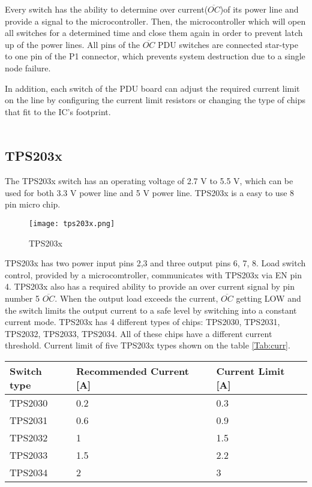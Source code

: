 Every switch has the ability to determine over current($\overline{OC}$)of its power line and provide a signal to the microcontroller. Then, the microcontroller which will open all switches for a determined time and close them again in order to prevent latch up of the power lines. All pins of the $ \overline {OC} $ PDU switches are connected star-type to one pin of the P1 connector, which prevents system destruction due to a single node failure.

In addition, each switch of the PDU board can adjust the required current limit on the line by configuring the current limit resistors or changing the type of chips that fit to the IC's footprint.    
  \\ \\
\subsection{TPS203x }
The TPS203x switch has an operating voltage of 2.7 V to 5.5 V, which can be used for both 3.3 V power line and 5 V power line. TPS203x is a easy to use 8 pin micro chip. 

\begin{figure}[h]
	\centering
	\texttt{[image: tps203x.png]}
	\caption{TPS203x \cite{26}}
	\label{fig: PDU}
\end{figure} 

TPS203x has  two power input pins 2,3 and three output pins 6, 7, 8. Load switch control, provided by a microcomtroller, communicates with TPS203x via EN pin 4. TPS203x also has a required ability to provide an over current signal by pin number 5 $\overline{OC}$. \cite{26} When the output load exceeds the current, $\overline{OC}$ getting LOW and the switch limits the output current to a safe level by switching into a constant current mode. TPS203x has 4 different types of chips: TPS2030, TPS2031, TPS2032, TPS2033, TPS2034. All of these chips have a different current threshold. Current limit of five TPS203x types shown on the table \ref{Tab:curr}.\\

\begin{tabular}{p{4cm}p{5cm}p{4cm}} \toprule
	Switch type & Recommended Current [A] & Current Limit [A]\\ \midrule
	TPS2030 & 0.2 & 0.3\\
	TPS2031 & 0.6 & 0.9\\
	TPS2032 & 1 & 1.5\\
	TPS2033 & 1.5 & 2.2 \\
	TPS2034 & 2 & 3 \\
	
	\bottomrule
	
\end{tabular}\\ \\ \\ \\
\label{Tab:curr}


